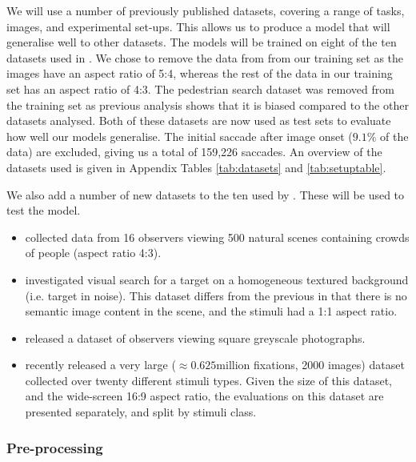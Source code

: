 \documentclass[a4paper, twocolumn, oneside, 10pt]{article}
\begin{document}
We will use a number of previously published datasets, covering a range of tasks, images, and experimental set-ups. This allows us to produce a model that will generalise well to other datasets. The models will be trained on eight of the ten datasets used in \cite{clarke-tatler2014}. We chose to remove the data from \cite{asher2013} from our training set as the images have an aspect ratio of 5:4, whereas the rest of the data in our training set has an aspect ratio of 4:3. The pedestrian search dataset \citep{ehinger2009} was removed from the training set as previous analysis \citep{clarke-tatler2014} shows that it is biased compared to the other datasets analysed. Both of these datasets are now used as test sets to evaluate how well our models generalise. The initial saccade after image onset ($9.1\%$ of the data) are excluded, giving us a total of 159,226 saccades. An overview of the datasets used is given in Appendix Tables \ref{tab:datasets} and \ref{tab:setuptable}. 


We also add a number of new datasets to the ten used by \cite{clarke-tatler2014}. These will be used to test the model. 

\begin{itemize}

\item \cite{jiang2014} collected data from 16 observers viewing 500 natural scenes containing crowds of people (aspect ratio 4:3).

\item \cite{clarke2009} investigated visual search for a target on a homogeneous textured background (i.e. target in noise). This dataset differs from the previous in that there is no semantic image content in the scene, and the stimuli had a 1:1 aspect ratio.

\item \cite{greene-wolfe2012} released a dataset of observers viewing square greyscale photographs.

\item \cite{borji2015} recently released a very large ($\approx 0.625$million fixations, 2000 images) dataset collected over twenty different stimuli types. Given the size of this dataset, and the wide-screen 16:9 aspect ratio, the evaluations on this dataset are presented separately, and split by stimuli class.

\end{itemize}


\subsubsection{Pre-processing}
\end{document}
